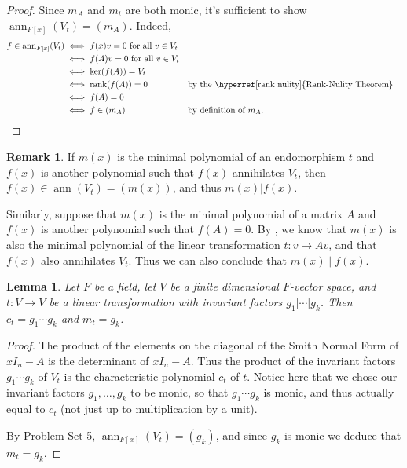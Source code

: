 \documentclass[12pt]{report}
\newtheorem{lemma}[theorem]{Lemma}
\numberwithin{equation}{section}
\numberwithin{theorem}{chapter}
\theoremstyle{definition}
\newtheorem*{basic properties}{Basic Properties}
\newtheorem*{Important Remark}{Important Remark}
\newtheorem{remark}[theorem]{Remark}
\DeclareMathOperator{\rank}{rank}
\renewcommand{\ker}{\operatorname{ker}}
\DeclareMathOperator{\ann}{ann}
\begin{document}
\begin{proof}
Since $m_A$ and $m_t$ are both monic, it's sufficient to show ${\ann}_{F[x]}(V_t)=(m_A)$. Indeed, 
$$\begin{aligned}
f\in {\ann}_{F[x]}(V_t) & \iff f(x)v=0 \textrm{ for all } v\in V_t\\
  & \iff f(A)v=0 \textrm{ for all } v\in V_t\\
   & \iff \ker(f(A))= V_t\\
    & \iff \rank(f(A))=0 && \textrm{by the \hyperref[rank nulity]{Rank-Nulity Theorem}}\\
     & \iff f(A)=0\\
       & \iff f\in (m_A) && \textrm{by definition of } m_A.\qedhere
\end{aligned}$$
\end{proof}

\begin{remark}
If $m(x)$ is the minimal polynomial of an endomorphism $t$ and $f(x)$ is another polynomial such that $f(x)$ annihilates $V_t$, then $f(x) \in \ann(V_t) = (m(x))$, and thus $m(x) | f(x)$.

Similarly, suppose that $m(x)$ is the minimal polynomial of a matrix $A$ and $f(x)$ is another polynomial such that $f(A)=0$. By , we know that $m(x)$ is also the minimal polynomial of the linear transformation $t: v \mapsto Av$, and that $f(x)$ also annihilates $V_t$. Thus we can also conclude that $m(x)\mid f(x)$.
\end{remark}


\begin{lemma}\label{cayley hamilton c = product of gs and m=largest g}
Let $F$ be a field, let $V$ be a finite dimensional $F$-vector space, and $t\!: V \to V$ be a linear transformation with invariant factors $g_1 | \cdots | g_k$. Then $c_t = g_1 \cdots g_k$ and $m_t = g_k$.
\end{lemma}



\begin{proof}
The product of the elements on the diagonal of the Smith Normal Form of $xI_n-A$ is the determinant of $xI_n-A$. Thus the product of the invariant factors $g_1 \cdots g_k$ of $V_t$ is the characteristic polynomial $c_t$ of $t$. Notice here that we chose our invariant factors $g_1, \ldots, g_k$ to be monic, so that $g_1 \cdots g_k$ is monic, and thus actually equal to $c_t$ (not just up to multiplication by a unit).

By Problem Set 5, $\ann_{F[x]}(V_t)=(g_k)$, and since $g_k$ is monic we deduce that $m_t=g_k$.
\end{proof}
\end{document}
